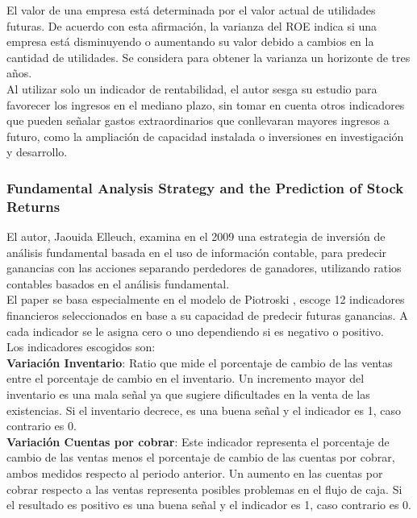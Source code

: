 El valor de una empresa está determinada por el valor actual de utilidades futuras. De acuerdo con esta afirmación, la varianza del ROE indica si una empresa está disminuyendo o aumentando su valor debido a cambios en la cantidad de utilidades. Se considera para obtener la varianza un horizonte de tres años.\\

Al utilizar solo un indicador de rentabilidad, el autor sesga su estudio para favorecer los ingresos en el mediano plazo, sin tomar en cuenta otros indicadores que pueden señalar gastos extraordinarios que conllevaran mayores ingresos a futuro, como la ampliación de capacidad instalada o inversiones en investigación y desarrollo.\\

\subsubsection{Fundamental Analysis Strategy and the Prediction of Stock Returns}

El autor, Jaouida Elleuch, examina en el 2009 \cite{Elleuch2009} una estrategia de inversión de análisis fundamental basada en el uso de información contable, para predecir ganancias con las acciones separando perdedores de ganadores, utilizando ratios contables basados en el análisis fundamental.\\

El paper se basa especialmente en el modelo de Piotroski \cite{Piotroski2000}, escoge 12 indicadores financieros seleccionados en base a su capacidad de predecir futuras ganancias. A cada indicador se le asigna cero o uno dependiendo si es negativo o positivo.\\

Los indicadores escogidos son:\\

\textbf{Variación Inventario}: Ratio que mide el porcentaje de cambio de las ventas entre el porcentaje de cambio en el inventario. Un incremento mayor del inventario es una mala señal ya que sugiere dificultades en la venta de las existencias. Si el inventario decrece, es una buena señal y el indicador es 1, caso contrario es 0.\\

\textbf{Variaci\'on Cuentas por cobrar}: Este indicador representa el porcentaje de cambio de las ventas menos el porcentaje de cambio de las cuentas por cobrar, ambos medidos respecto al periodo anterior. Un aumento en las cuentas por cobrar respecto a las ventas representa posibles problemas en el flujo de caja. Si el resultado es positivo es una buena señal y el indicador es 1, caso contrario es 0.\\

